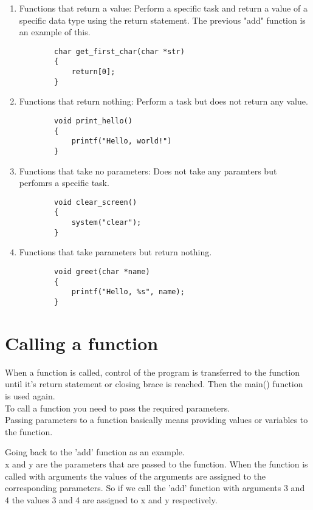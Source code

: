 \documentclass[12pt, letterpaper]{report}
\begin{document}
\begin{enumerate}
	\item Functions that return a value:
		Perform a specific task and return a value of a specific data type using 
		the return statement. The previous "add" function is an example of this.
	\begin{lstlisting}
		char get_first_char(char *str)
		{
			return[0];
		}
	\end{lstlisting}
	\item Functions that return nothing:
	Perform a task but does not return any value.
	\begin{lstlisting}
		void print_hello()
		{
			printf("Hello, world!")
		}
	\end{lstlisting}
	\item Functions that take no parameters:
		Does not take any paramters but perfomrs a specific task.
	\begin{lstlisting}
		void clear_screen()
		{
			system("clear");
		}
	\end{lstlisting}
	\item Functions that take parameters but return nothing.
	\begin{lstlisting}
		void greet(char *name)
		{
			printf("Hello, %s", name);
		}
	\end{lstlisting}
\end{enumerate}


\section{Calling a function}
When a function is called, control of the program is transferred to the function
until it's return statement or closing brace is reached. Then the main() 
function is used again.\\

To call a function you need to pass the required parameters.\\

Passing parameters to a function basically means providing values or variables
to the function.

Going back to the 'add' function as an example. \\
x and y are the parameters that are passed to the function. When the function is
called with arguments the values of the arguments are assigned to the corresponding
parameters. So if we call the 'add' function with arguments 3 and 4 the values
3 and 4 are assigned to x and y respectively.\\
\end{document}
